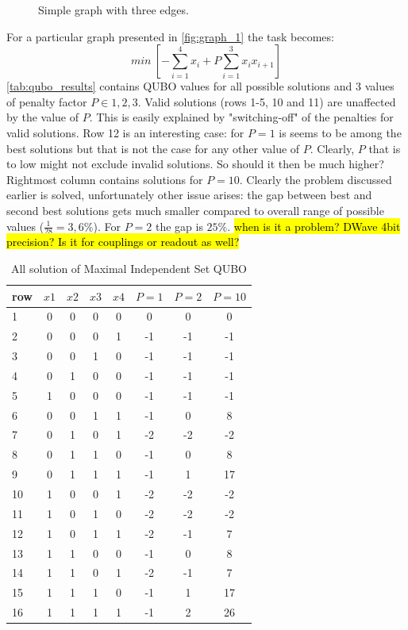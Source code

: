 \begin{figure}[h]
	\label{fig:graph_1}
	\caption{Simple graph with three edges.}
    \centering
    \def\svgwidth{0.25\textwidth}
    
\end{figure}

For a particular graph presented in \autoref{fig:graph_1} the task becomes:
\[min\ \left[-\sum_{i=1}^4x_i + P\sum_{i=1}^3 x_i x_{i+1}\right]\]
\autoref{tab:qubo_results} contains QUBO values for all possible solutions and 3 values of penalty factor $P\in{1,2,3}$. Valid solutions (rows 1-5, 10 and 11) are unaffected by the value of $P$. This is easily explained by "switching-off" of the penalties for valid solutions. Row 12 is an interesting case: for $P=1$ is seems to be among the best solutions but that is not the case for any other value of $P$. Clearly, $P$ that is to low might not exclude invalid solutions. So should it then be much higher? Rightmost column contains solutions for $P=10$. Clearly the problem discussed earlier is solved, unfortunately other issue arises: the gap between best and second best solutions gets much smaller compared to overall range of possible values ($ \frac{1}{28}=3,6\% $). For $P=2$ the gap is $25\%$. \hl{when is it a problem? DWave 4bit precision? Is it for couplings or readout as well?}

\begin{table}
\begin{center}
\begin{tabular}{l | c c c c c c c }
row&$x1$&$x2$&$x3$&$x4$&$P=1$&$P=2$&$P=10$\\
 \hline
1&0&0&0&0&0&0&0\\ 
2&0&0&0&1&-1&-1&-1\\ 
3&0&0&1&0&-1&-1&-1\\
4&0&1&0&0&-1&-1&-1\\
5&1&0&0&0&-1&-1&-1\\ 
6&0&0&1&1&-1&0&8\\ 
7&0&1&0&1&-2&-2&-2\\ 
8&0&1&1&0&-1&0&8\\ 
9&0&1&1&1&-1&1&17\\ 
10&1&0&0&1&-2&-2&-2\\ 
11&1&0&1&0&-2&-2&-2\\ 
12&1&0&1&1&-2&-1&7\\ 
13&1&1&0&0&-1&0&8\\ 
14&1&1&0&1&-2&-1&7\\ 
15&1&1&1&0&-1&1&17\\ 
16&1&1&1&1&-1&2&26\\
\end{tabular}
\end{center}
\caption{All solution of Maximal Independent Set QUBO}
\label{tab:qubo_results}
\end{table}

